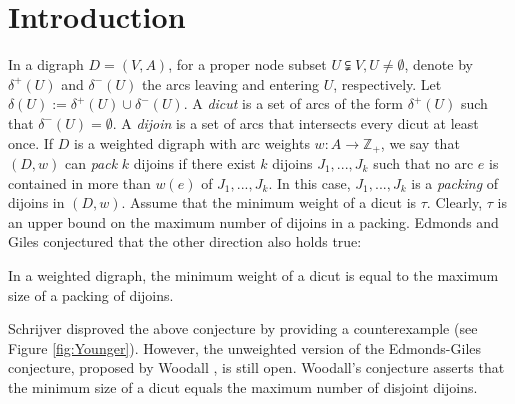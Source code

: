\documentclass[runningheads]{llncs}
\begin{document}
\section{Introduction}
In a digraph $D=(V,A)$, for a proper node subset $U\subsetneqq V, U\neq\emptyset$, denote by $\delta^+(U)$ and $\delta^-(U)$ the arcs leaving and entering $U$, respectively. Let $\delta(U):=\delta^+(U)\cup \delta^-(U)$. A \textit{dicut} is a set of arcs of the form $\delta^+(U)$ such that $\delta^-(U)=\emptyset$. A \textit{dijoin} is a set of arcs that intersects every dicut at least once. 
If $D$ is a weighted digraph with arc weights $w:A\rightarrow \mathbb{Z}_+$, we say that $(D,w)$ can \textit{pack} $k$ dijoins if there exist $k$ dijoins $J_1,...,J_k$ such that no arc $e$ is contained in more than $w(e)$ of $J_1,...,J_k$.
In this case, $J_1,...,J_k$ is a \textit{packing} of dijoins in $(D,w)$. 
Assume that the minimum weight of a dicut is $\tau$. Clearly, $\tau$ is an upper bound on the maximum number of dijoins in a packing. 
Edmonds and Giles \cite{edmonds1977min} conjectured that the other direction also holds true:
\begin{conjecture}\label{conj:E-G}
    In a weighted digraph, the minimum weight of a dicut is equal to the maximum size of a packing of dijoins.
\end{conjecture}
Schrijver \cite{schrijver1980counterexample} disproved the above conjecture by providing a counterexample (see Figure \ref{fig:Younger}). However,
the unweighted version of the Edmonds-Giles conjecture, proposed by Woodall \cite{woodall1978menger}, is still open.
Woodall's conjecture asserts that the minimum size of a dicut equals the maximum number of disjoint dijoins.
\end{document}
